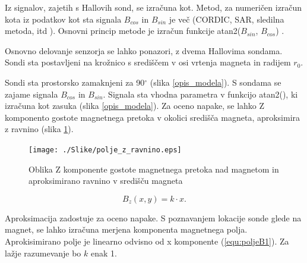 Iz signalov, zajetih s Hallovih sond, se izračuna kot. Metod, za numeričen izračun kota iz podatkov kot sta signala $B_{cos}$ in $B_{sin}$ je več (CORDIC, SAR, sledilna metoda, itd \cite{ICHaus_interpolate}). Osnovni princip metode je izračun funkcije atan2($B_{sin}$, $B_{cos}$) \cite{atan2Matlab}.

Osnovno delovanje senzorja se lahko ponazori, z dvema Hallovima sondama.  Sondi sta postavljeni na krožnico s središčem v osi vrtenja magneta in radijem $r_0$.

Sondi sta prostorsko zamaknjeni za 90$^\circ$ (slika \ref{opis_modela}).  S sondama se zajame signala $B_{cos}$ in $B_{sin}$. Signala sta vhodna parametra v funkcijo atan2(), ki izračuna kot zasuka (slika \ref{opis_modela}). Za oceno napake, se lahko Z komponento gostote magnetnega pretoka v okolici središča magneta, aproksimira z ravnino (slika \ref{polje_z_ravnino}).
\begin{figure}[h]
	\centering
	\texttt{[image: ./Slike/polje\_z\_ravnino.eps]}
	\caption{Oblika Z komponente gostote magnetnega pretoka nad magnetom in aproksimirano ravnino v središču magneta}
	\label{polje_z_ravnino}
\end{figure}
\begin{equation}
\label{equ:poljeB1}
B_z(x,y)=k\cdot x.
\end{equation} 



Aproksimacija zadostuje za oceno napake. S poznavanjem lokacije sonde glede na magnet, se lahko izračuna merjena komponenta magnetnega polja. Aprokisimirano polje je linearno odvisno od x komponente (\ref{equ:poljeB1}). Za lažje razumevanje bo $k$ enak 1.

